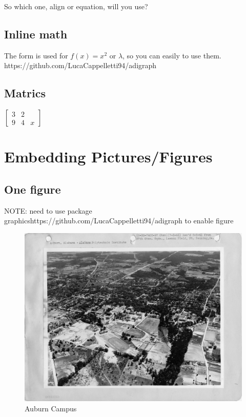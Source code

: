\documentclass{article}
\begin{document}
  \subsubsection{}
  So which one, align or equation, will you use?


  \subsection{Inline math}
  The form is used for $ f(x) = x^ 2 $ or $\lambda$, so you can easily to use them. 
  https://github.com/LucaCappelletti94/adigraph
  \subsection{Matrics}
  $
  \left[
  \begin{matrix}
    3 & 2 \\
    9 & 4 & x
  \end{matrix}
  \right]
  $

  \newpage


  \section{Embedding Pictures/Figures}

  \subsection{One figure}
  NOTE: need to use package graphicshttps://github.com/LucaCappelletti94/adigraph to enable figure

  \begin{figure}[h!]
    \includegraphics[width=\linewidth]{auburn_01.jpg}
    \caption{Auburn Campus}
    \label{fig:au01}
  \end{figure}
\end{document}
